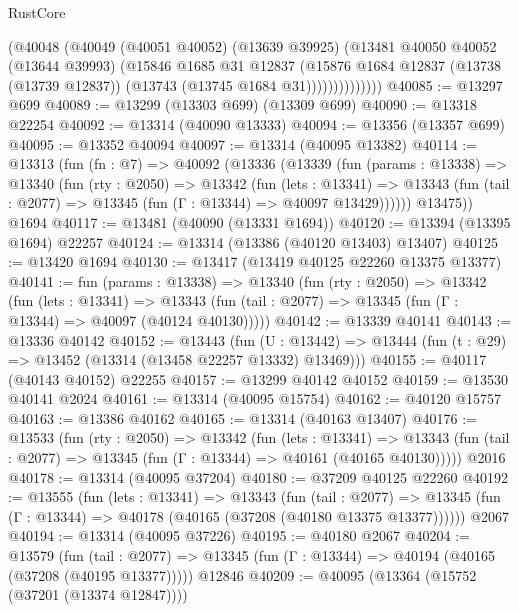 \begin{lexlean}{RustCore}
\begin{coremodule}
                  (@40048
                    (@40049
                      (@40051 @40052)
                      (@13639 @39925)
                      (@13481
                        @40050
                        @40052
                        (@13644 @39993)
                        (@15846
                          @1685
                          @31
                          @12837
                          (@15876
                            @1684
                            @12837
                            (@13738 (@13739 @12837))
                            (@13743 (@13745 @1684 @31))))))))))))))
@40085 := @13297 @699
@40089 := @13299 (@13303 @699) (@13309 @699)
@40090 := @13318 @22254
@40092 := @13314 (@40090 @13333)
@40094 := @13356 (@13357 @699)
@40095 := @13352 @40094
@40097 := @13314 (@40095 @13382)
@40114 := @13313
    (fun (fn : @7) =>
    @40092
      (@13336
        (@13339
          (fun (params : @13338) =>
          @13340
            (fun (rty : @2050) =>
            @13342
              (fun (lets : @13341) =>
              @13343 (fun (tail : @2077) => @13345 (fun (Γ : @13344) => @40097 @13429))))))
        @13475))
    @1694
@40117 := @13481 (@40090 (@13331 @1694))
@40120 := @13394 (@13395 @1694) @22257
@40124 := @13314 (@13386 (@40120 @13403) @13407)
@40125 := @13420 @1694
@40130 := @13417 (@13419 @40125 @22260 @13375 @13377)
@40141 := fun (params : @13338) =>
  @13340
    (fun (rty : @2050) =>
    @13342
      (fun (lets : @13341) =>
      @13343 (fun (tail : @2077) => @13345 (fun (Γ : @13344) => @40097 (@40124 @40130)))))
@40142 := @13339 @40141
@40143 := @13336 @40142
@40152 := @13443
    (fun (U : @13442) => @13444 (fun (t : @29) => @13452 (@13314 (@13458 @22257 @13332) @13469)))
@40155 := @40117 (@40143 @40152) @22255
@40157 := @13299 @40142 @40152
@40159 := @13530 @40141 @2024
@40161 := @13314 (@40095 @15754)
@40162 := @40120 @15757
@40163 := @13386 @40162
@40165 := @13314 (@40163 @13407)
@40176 := @13533
    (fun (rty : @2050) =>
    @13342
      (fun (lets : @13341) =>
      @13343 (fun (tail : @2077) => @13345 (fun (Γ : @13344) => @40161 (@40165 @40130)))))
    @2016
@40178 := @13314 (@40095 @37204)
@40180 := @37209 @40125 @22260
@40192 := @13555
    (fun (lets : @13341) =>
    @13343
      (fun (tail : @2077) =>
      @13345 (fun (Γ : @13344) => @40178 (@40165 (@37208 (@40180 @13375 @13377))))))
    @2067
@40194 := @13314 (@40095 @37226)
@40195 := @40180 @2067
@40204 := @13579
    (fun (tail : @2077) => @13345 (fun (Γ : @13344) => @40194 (@40165 (@37208 (@40195 @13377)))))
    @12846
@40209 := @40095 (@13364 (@15752 (@37201 (@13374 @12847))))

\end{coremodule}
\end{lexlean}
